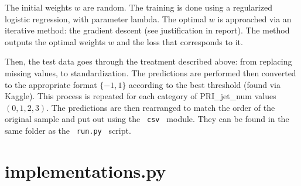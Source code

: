 \documentclass[11pt, oneside]{article}   	%
\begin{document}
The initial weights $w$ are random. The training is done using a regularized logistic regression, with parameter lambda. The optimal $w$ is approached via an iterative method: the gradient descent (see justification in report). The method outputs the optimal weights $w$ and the loss that corresponds to it.

Then, the test data goes through the treatment described above: from replacing missing values, to standardization. The predictions are performed then converted to the appropriate format $ \{ -1, 1 \}$ according to the best threshold (found via Kaggle). This process is repeated for each category of PRI\_jet\_num values $(0,1,2,3)$. The predictions are then rearranged to match the order of the original sample and put out using the \lstinline" csv " module. They can be found in the same folder as the \lstinline" run.py " script.

\section{implementations.py} \label{impl}
\end{document}

